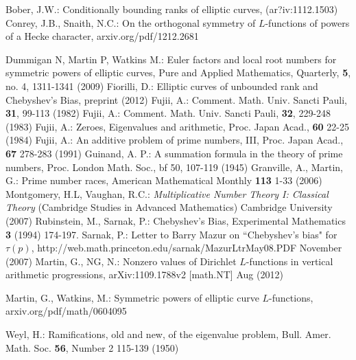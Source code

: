 \documentclass[11pt]{article}
\theoremstyle{plain}
\theoremstyle{definition}
\numberwithin{equation}{section}
\numberwithin{figure}{section}
\numberwithin{table}{section}
\begin{document}
\begin{thebibliography}{bib}
 \label{B} Bober, J.W.: Conditionally bounding ranks of elliptic curves, (ar?iv:1112.1503)
 \label{C-S} Conrey, J.B., Snaith, N.C.:  On the orthogonal symmetry of $L$-functions of powers of a Hecke character, arxiv.org/pdf/1212.2681


 \label{DMW} Dummigan N, Martin P, Watkins M.: Euler factors and local root numbers for symmetric powers of elliptic curves, Pure and Applied Mathematics, Quarterly, {\bf 5},  no. 4, 1311-1341  (2009)
  \label{F}  Fiorilli, D.: Elliptic curves of unbounded rank and Chebyshev's Bias, preprint (2012)
        \label{Fu1} Fujii, A.:  Comment. Math. Univ. Sancti Pauli, {\bf 31}, 99-113 (1982)
        \label{Fu2} Fujii, A.:  Comment. Math. Univ. Sancti Pauli, {\bf 32}, 229-248 (1983)
      \label{Fu3} Fujii, A.: Zeroes, Eigenvalues and arithmetic, Proc. Japan Acad., {\bf 60} 22-25 (1984)
    \label{Fu4} Fujii, A.: An additive problem of prime numbers, III, Proc. Japan Acad., {\bf 67} 278-283 (1991)
   \label{G} Guinand, A. P.: A summation formula in the theory of prime numbers, Proc. London Math. Soc., {bf 50}, 107-119 (1945)
 \label{GM}  Granville, A., Martin, G.:  Prime number races,
American Mathematical Monthly {\bf 113} 1-33 (2006)
  \label{MV} Montgomery, H.L, Vaughan, R.C.:   {\it Multiplicative Number Theory I: Classical Theory} (Cambridge Studies in Advanced Mathematics) Cambridge University (2007)
  \label{R-S}   Rubinstein, M., Sarnak, P.: Chebyshev's Bias,  Experimental  Mathematics {\bf 3}  (1994) 174-197.
    \label{S} Sarnak, P.: Letter to Barry Mazur on ``Chebyshev's bias" for $\tau(p)$, http://web.math.princeton.edu/sarnak/MazurLtrMay08.PDF  November (2007)
  \label{M-N} Martin, G., NG, N.: Nonzero values of Dirichlet $L$-functions in vertical arithmetic progressions,
    arXiv:1109.1788v2 [math.NT]  Aug (2012)

        \label{M-W} Martin, G., Watkins, M.:  Symmetric powers of elliptic curve $L$-functions, arxiv.org/pdf/math/0604095

     \label{W}  Weyl, H.:  Ramifications, old and new, of the eigenvalue problem,  Bull. Amer. Math. Soc. {\bf 56}, Number 2 115-139 (1950)
\end{thebibliography}
\end{document}
